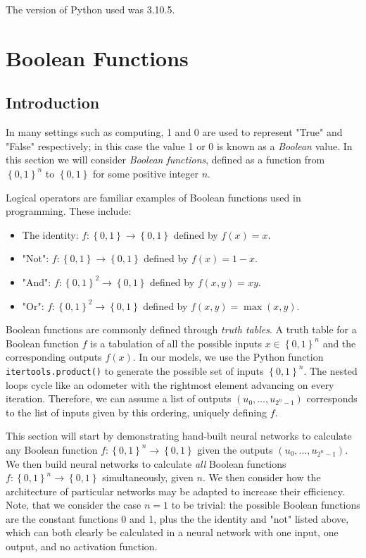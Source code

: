 \documentclass{somasmsc}
\begin{document}
The version of Python used was 3.10.5.

\chapter{Boolean Functions}\label{bool}

\section{Introduction}

In many settings such as computing, 1 and 0 are used to represent "True" and "False" respectively; in this case the value 1 or 0 is known as a \textit{Boolean} value. In this section we will consider \textit{Boolean functions}, defined as a function from $\left\{0, 1\right\}^n$ to $\left\{0, 1\right\}$ for some positive integer $n$.

Logical operators are familiar examples of Boolean functions used in programming. These include:
\begin{itemize}
    \item The identity: $f:\left\{0, 1\right\} \rightarrow \left\{0, 1\right\}$ defined by $f(x) = x$.
    \item "Not": $f:\left\{0, 1\right\} \rightarrow \left\{0, 1\right\}$ defined by $f(x) = 1-x$.
    \item "And": $f:\left\{0, 1\right\}^2 \rightarrow \left\{0, 1\right\}$ defined by $f(x,y) = xy$.
    \item "Or": $f:\left\{0, 1\right\}^2 \rightarrow \left\{0, 1\right\}$ defined by $f(x,y) = \max{\left(x, y\right)}$.
\end{itemize}

Boolean functions are commonly defined through \textit{truth tables}. A truth table for a Boolean function $f$ is a tabulation of all the possible inputs $x \in \left\{0, 1\right\}^n$ and the corresponding outputs $f(x)$. In our models, we use the Python function \verb|itertools.product()| to generate the possible set of inputs $\left\{0, 1\right\}^n$. The nested loops cycle like an odometer with the rightmost element advancing on every iteration. Therefore, we can assume a list of outputs $\left(u_0, \dots, u_{2^n-1}\right)$ corresponds to the list of inputs given by this ordering, uniquely defining $f$.

This section will start by demonstrating hand-built neural networks to calculate any Boolean function $f:\left\{0, 1\right\}^n \rightarrow \left\{0, 1\right\}$ given the outputs $\left(u_0, \dots, u_{2^n-1}\right)$. We then build neural networks to calculate \textit{all} Boolean functions $f:\left\{0, 1\right\}^n \rightarrow \left\{0, 1\right\}$ simultaneously, given $n$. We then consider how the architecture of particular networks may be adapted to increase their efficiency. Note, that we consider the case $n=1$ to be trivial: the possible Boolean functions are the constant functions 0 and 1, plus the the identity and "not" listed above, which can both clearly be calculated in a neural network with one input, one output, and no activation function.
\end{document}
